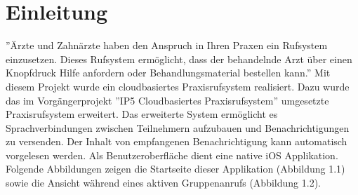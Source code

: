 \section{Einleitung}

''Ärzte und Zahnärzte haben den Anspruch in Ihren Praxen ein Rufsystem einzusetzen.
Dieses Rufsystem ermöglicht, dass der behandelnde Arzt über einen Knopfdruck Hilfe anfordern oder Behandlungsmaterial bestellen kann.''\cite{aufgabenstellung}
Mit diesem Projekt wurde ein cloudbasiertes Praxisrufsystem realisiert.
Dazu wurde das im Vorgängerprojekt ''IP5 Cloudbasiertes Praxisrufsystem'' umgesetzte Praxisrufsystem erweitert.
Das erweiterte System ermöglicht es Sprachverbindungen zwischen Teilnehmern aufzubauen und Benachrichtigungen zu versenden.
Der Inhalt von empfangenen Benachrichtigung kann automatisch vorgelesen werden.
Als Benutzeroberfläche dient eine native iOS Applikation.
Folgende Abbildungen zeigen die Startseite dieser Applikation (Abbildung 1.1) sowie die Ansicht während eines aktiven Gruppenanrufs (Abbildung 1.2).

